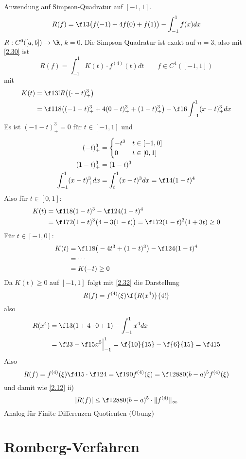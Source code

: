 \documentclass[11pt]{scrbook}
\begin{document}
\begin{ex*}
	Anwendung auf Simpson-Quadratur auf $[-1,1]$.
	\[
		R(f) = \f 13 \big(f(-1) + 4f(0) + f(1)\big) -\int_{-1}^1 f(x) dx
	\]
	$R: C^0 ([a,b]) \to \R$, $k=0$.
	Die Simpson-Quadratur ist exakt auf $n=3$, also mit \ref{2.30} ist
	\[
		R(f) = \int_{-1}^1 K(t) \cdot f^{(4)}(t) dt \qquad f\in C^4([-1,1])
	\]
	mit
	\begin{align*}
		K(t) &= \f 1{3!}R \big((\cdot - t)_+^3\big) \\
		&= \f 1{18} \big((-1-t)_+^3+ 4(0-t)_+^3 + (1-t)_+^3 \big) - \f 16 \int_{-1}^1 (x-t)_+^3 dx \\
	\end{align*}
	Es ist $(-1-t)_+^3 = 0$ für $t\in [-1,1]$ und
	\begin{align*}
		(-t)_+^3 &= \begin{cases}
			-t^3 & t\in[-1,0] \\
			0 & t\in[0,1]
		\end{cases} \\
		(1-t)_+^3 &= (1-t)^3 \\
		\int_{-1}^1 (x-t)_+^3 dx &= \int_t^1 (x-t)^3 dx = \f 14(1-t)^4
	\end{align*}
	Also für $t\in [0,1]$:
	\begin{align*}
		K(t) &= \f 1{18} (1-t)^3 - \f 1{24} (1-t)^4 \\
			&= \f 1{72}(1-t)^3\big(4-3(1-t)\big) = \f 1{72}(1-t)^3(1+3t) \ge 0
	\end{align*}
	Für $t\in [-1,0]$:
	\begin{align*}
		K(t) &= \f 1{18}\big(-4t^3 + (1-t)^3\big) - \f 1{24}(1-t)^4 \\
		&=  \dotsb \\
		&= K(-t) \ge 0
	\end{align*}
	Da $K(t) \ge 0$ auf $[-1,1]$ folgt mit \ref{2.32} die Darstellung
	\[
		R(f) = f^{(4)}(\xi) \f {R(x^4)}{4!}
	\]
	also
	\begin{align*}
		R(x^4) &= \f 13 (1+4\cdot 0 + 1) - \int_{-1}^1 x^4 dx \\
		&= \f 23 - \f 15 x^5 \Big|_{-1}^1
		= \f {10}{15} - \f {6}{15} = \f 4{15}
	\end{align*}
	Also
	\[
		R(f) = f^{(4)}(\xi) \f 4{15} \cdot \f 1{24} 
		= \f 1{90} f^{(4)}(\xi) 
		= \f 1{2880} (b-a)^5 f^{(4)}(\xi)
	\]
	und damit wie \ref{2.12} ii)
	\[
		|R(f)| \le \f 1{2880} (b-a)^5 \cdot \|f^{(4)}\|_\infty
	\]
	Analog für Finite-Differenzen-Quotienten (Übung)
\end{ex*}


\section{Romberg-Verfahren}
\end{document}
